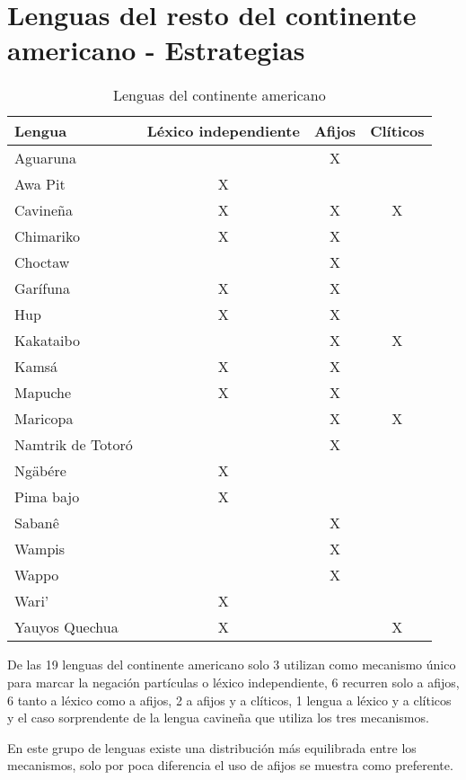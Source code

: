 \section*{Lenguas del resto del continente americano - Estrategias}

\begin{table}[htbp]
\centering
\begin{tabular}{lccc}
\textbf{Lengua} & \textbf{Léxico independiente} & \textbf{Afijos} & \textbf{Clíticos} \\
\hline
Aguaruna &       & X     &  \\
Awa Pit & X     &       &  \\
Cavineña & X     & X     & X \\
Chimariko & X     & X     &  \\
Choctaw &       & X     &  \\
Garífuna & X     & X     &  \\
Hup   & X     & X     &  \\
Kakataibo &       & X     & X \\
Kamsá & X     & X     &  \\
Mapuche & X     & X     &  \\
Maricopa &       & X     & X \\
Namtrik de Totoró &  & X &  \\
Ngäbére & X     &       &  \\
Pima bajo & X     &       &  \\
Sabanê &       & X     &  \\
Wampis &       & X     &  \\
Wappo &       & X     &  \\
Wari' & X     &       &  \\
Yauyos Quechua & X     &       & X \\
\hline
\end{tabular}
\caption{Lenguas del continente americano}
\label{cuadro6}
\end{table}

\noindent De las 19 lenguas del continente americano solo 3 utilizan como mecanismo único para marcar la negación partículas o léxico independiente, 6 recurren solo a afijos, 6 tanto a léxico como a afijos, 2 a afijos y a clíticos, 1 lengua a léxico y a clíticos y el caso sorprendente de la lengua cavineña que utiliza los tres mecanismos.

En este grupo de lenguas existe una distribución más equilibrada entre los mecanismos, solo por poca diferencia el uso de afijos se muestra como preferente.

